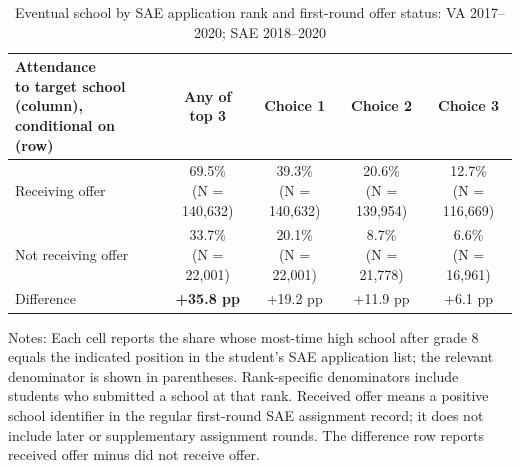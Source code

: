 \begin{table}[!htbp]
\centering
\caption{Eventual school by SAE application rank and first-round offer status: VA 2017--2020; SAE 2018--2020}
\label{tab:application-rank-takeup-maximum-data}
\setlength{\tabcolsep}{4pt}
\begin{tabular}{lcccc}
\toprule
\shortstack{Attendance \\
to target school (column), \\ conditional on (row) } & \shortstack{Any of\\top 3} & Choice 1 & Choice 2 & Choice 3 \\
\midrule
Receiving offer & \shortstack{69.5\%\\(N = 140,632)} & \shortstack{39.3\%\\(N = 140,632)} & \shortstack{20.6\%\\(N = 139,954)} & \shortstack{12.7\%\\(N = 116,669)} \\
Not receiving offer  & \shortstack{33.7\%\\(N = 22,001)} & \shortstack{20.1\%\\(N = 22,001)} & \shortstack{8.7\%\\(N = 21,778)} & \shortstack{6.6\%\\(N = 16,961)} \\
\bottomrule
Difference & \textbf{+35.8 pp} & +19.2 pp & +11.9 pp & +6.1 pp \\
\bottomrule
\end{tabular}
\par\medskip
\footnotesize
\begin{minipage}{0.95\textwidth}
Notes: Each cell reports the share whose most-time high school after grade 8 equals the indicated position in the student's SAE application list; the relevant denominator is shown in parentheses. Rank-specific denominators include students who submitted a school at that rank. Received offer means a positive school identifier in the regular first-round SAE assignment record; it does not include later or supplementary assignment rounds. The difference row reports received offer minus did not receive offer.
\end{minipage}
\end{table}
